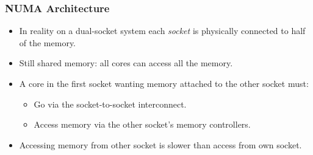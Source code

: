 \documentclass[aspectratio=169]{beamer}
\begin{document}
\begin{frame}
\frametitle{NUMA Architecture}
\begin{itemize}
  \item In reality on a dual-socket system each \emph{socket} is physically connected to half of the memory.
  \item Still shared memory: all cores can access all the memory.
  \item A core in the first socket wanting memory attached to the other socket must:
    \begin{itemize}
      \item Go via the socket-to-socket interconnect.
      \item Access memory via the other socket's memory controllers.
    \end{itemize}
  \item Accessing memory from other socket is slower than access from own socket.
\end{itemize}
\begin{center}
\end{center}
\end{frame}

\end{document}
